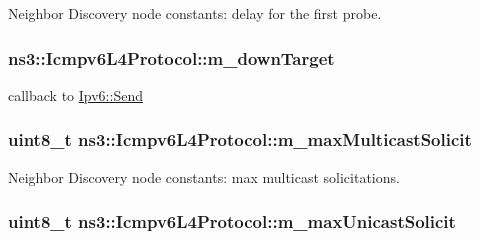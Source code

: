 Neighbor Discovery node constants\+: delay for the first probe. 

\subsubsection[{\texorpdfstring{m\+\_\+down\+Target}{m_downTarget}}]{ ns3\+::\+Icmpv6\+L4\+Protocol\+::m\+\_\+down\+Target\hspace{0.3cm}{\ttfamily [private]}}\hypertarget{classns3_1_1Icmpv6L4Protocol_a8cd5beb542044689be316d6e6963bb3a}{}\label{classns3_1_1Icmpv6L4Protocol_a8cd5beb542044689be316d6e6963bb3a}


callback to \hyperlink{classns3_1_1Ipv6_a2aad308983b20eb54334bb0d3db31004}{Ipv6\+::\+Send} 

\subsubsection[{\texorpdfstring{m\+\_\+max\+Multicast\+Solicit}{m_maxMulticastSolicit}}]{\setlength{\rightskip}{0pt plus 5cm}uint8\+\_\+t ns3\+::\+Icmpv6\+L4\+Protocol\+::m\+\_\+max\+Multicast\+Solicit\hspace{0.3cm}{\ttfamily [private]}}\hypertarget{classns3_1_1Icmpv6L4Protocol_a10486bb2cca386e400fa833e19f93502}{}\label{classns3_1_1Icmpv6L4Protocol_a10486bb2cca386e400fa833e19f93502}


Neighbor Discovery node constants\+: max multicast solicitations. 

\subsubsection[{\texorpdfstring{m\+\_\+max\+Unicast\+Solicit}{m_maxUnicastSolicit}}]{\setlength{\rightskip}{0pt plus 5cm}uint8\+\_\+t ns3\+::\+Icmpv6\+L4\+Protocol\+::m\+\_\+max\+Unicast\+Solicit\hspace{0.3cm}{\ttfamily [private]}}\hypertarget{classns3_1_1Icmpv6L4Protocol_a772aa2162734a24996b92d673127e7eb}{}\label{classns3_1_1Icmpv6L4Protocol_a772aa2162734a24996b92d673127e7eb}


